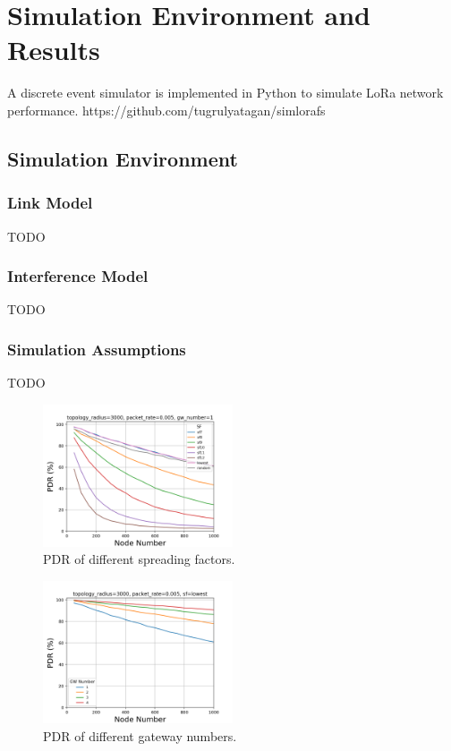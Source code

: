 \documentclass[conference]{IEEEtran}
\begin{document}
\section{Simulation Environment and Results} \label{Simulation Environment and Results}
A discrete event simulator is implemented in Python to simulate LoRa network performance. https://github.com/tugrulyatagan/simlorafs

\subsection{Simulation Environment}

\subsubsection{Link Model}
TODO

\subsubsection{Interference Model}
TODO

\subsubsection{Simulation Assumptions}
TODO

\begin{figure}
\centering
\includegraphics[width=0.5\textwidth]{sf_pdr}
\caption{PDR of different spreading factors.}
\label{fig:sf_1000}
\end{figure}

\begin{figure}
\centering
\includegraphics[width=0.5\textwidth]{gw_pdr}
\caption{PDR of different gateway numbers.}
\label{fig:sf_3000}
\end{figure}
\end{document}

